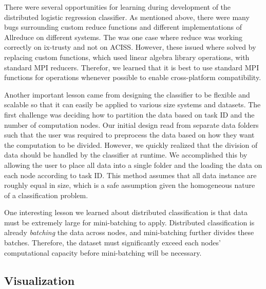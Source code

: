 There were several opportunities for learning during development of the distributed logistic regression classifier.  As mentioned above, there were many bugs surrounding custom reduce functions and different implementations of Allreduce on different systems.  The was one case where reduce was working correctly on ix-trusty and not on ACISS.  However, these issued where solved by replacing custom functions, which used linear algebra library operations, with standard MPI reducers.  Therefor, we learned that it is best to use standard MPI functions for operations whenever possible to enable cross-platform compatibility.

Another important lesson came from designing the classifier to be flexible and scalable so that it can easily be applied to various size systems and datasets.  The first challenge was deciding how to partition the data based on task ID and the number of computation nodes.  Our initial design read from separate data folders such that the user was required to preprocess the data based on how they want the computation to be divided.  However, we quickly realized that the division of data should be handled by the classifier at runtime.  We accomplished this by allowing the user to place all data into a single folder and the loading the data on each node according to task ID.  This method assumes that all data instance are roughly equal in size, which is a safe assumption given the homogeneous nature of a classification problem.

One interesting lesson we learned about distributed classification is that data must be extremely large for mini-batching to apply.  Distributed classification is already \emph{batching} the data across nodes, and mini-batching further divides these batches.  Therefore, the dataset must significantly exceed each nodes' computational capacity before mini-batching will be necessary.


\subsection{Visualization}
